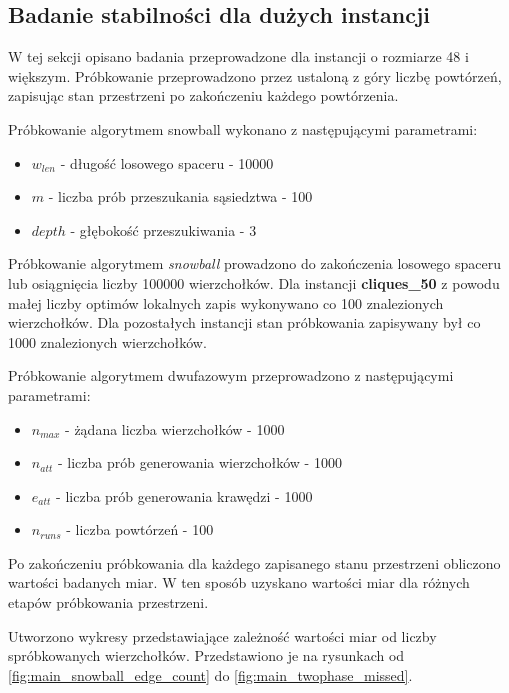 \subsection{Badanie stabilności dla dużych instancji}
W tej sekcji opisano badania przeprowadzone dla instancji o rozmiarze 48 i większym.
Próbkowanie przeprowadzono przez ustaloną z góry liczbę powtórzeń, zapisując stan przestrzeni po zakończeniu każdego powtórzenia.

Próbkowanie algorytmem snowball wykonano z następującymi parametrami:
\begin{itemize}
    \item $w_{len}$ - długość losowego spaceru - 10000
    \item $m$ - liczba prób przeszukania sąsiedztwa - 100
    \item $depth$ - głębokość przeszukiwania - 3
\end{itemize}

Próbkowanie algorytmem \textit{snowball} prowadzono do zakończenia losowego spaceru lub osiągnięcia liczby 100000 wierzchołków.
Dla instancji \textbf{cliques\_50} z powodu małej liczby optimów lokalnych zapis wykonywano co 100 znalezionych wierzchołków.
Dla pozostałych instancji stan próbkowania zapisywany był co 1000 znalezionych wierzchołków.

Próbkowanie algorytmem dwufazowym przeprowadzono z następującymi parametrami:
\begin{itemize}
    \item $n_{max}$ - żądana liczba wierzchołków - 1000
    \item $n_{att}$ - liczba prób generowania wierzchołków - 1000
    \item $e_{att}$ - liczba prób generowania krawędzi - 1000
    \item $n_{runs}$ - liczba powtórzeń - 100
\end{itemize}

Po zakończeniu próbkowania dla każdego zapisanego stanu przestrzeni obliczono wartości badanych miar. W ten sposób uzyskano
wartości miar dla różnych etapów próbkowania przestrzeni.

Utworzono wykresy przedstawiające zależność wartości miar od liczby spróbkowanych wierzchołków.
Przedstawiono je na rysunkach od \ref{fig:main_snowball_edge_count} do \ref{fig:main_twophase_missed}.

